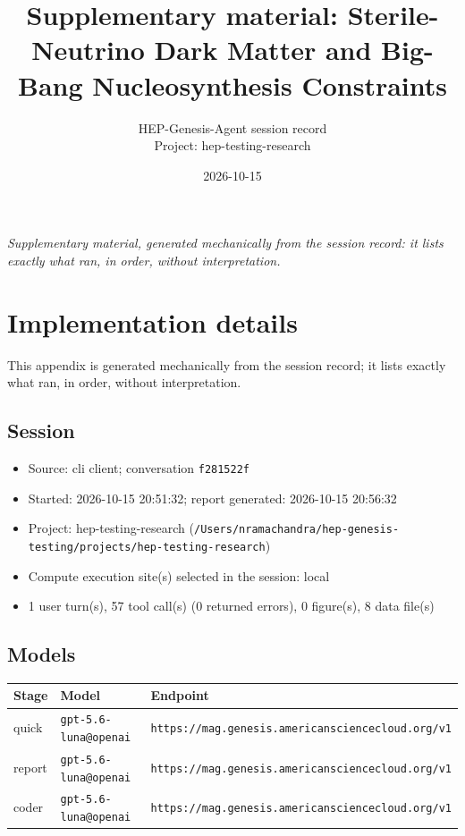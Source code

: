 \documentclass[11pt,a4paper]{article}
\title{Supplementary material: Sterile-Neutrino Dark Matter and Big-Bang Nucleosynthesis Constraints}
\author{HEP-Genesis-Agent session record \\ \small Project: hep-testing-research}
\date{2026-10-15}
\begin{document}
\maketitle
\noindent\textit{\small Supplementary material, generated mechanically from the session record: it lists exactly what ran, in order, without interpretation.}
\vspace{1em}



\appendix
\section{Implementation details}
\label{app:impl}
This appendix is generated mechanically from the session record; it lists exactly what ran, in order, without interpretation.
\subsection{Session}
\begin{itemize}
  \item Source: cli client; conversation \texttt{f281522f}
  \item Started: 2026-10-15 20:51:32; report generated: 2026-10-15 20:56:32
  \item Project: hep-testing-research (\texttt{/\allowbreak{}Users/\allowbreak{}nramachandra/\allowbreak{}hep-genesis-testing/\allowbreak{}projects/\allowbreak{}hep-testing-research})
  \item Compute execution site(s) selected in the session: local
  \item 1 user turn(s), 57 tool call(s) (0 returned errors), 0 figure(s), 8 data file(s)
\end{itemize}
\subsection{Models}
\begin{longtable}{@{}p{}p{}p{}@{}}
\toprule Stage & Model & Endpoint \\ \midrule \endhead
quick & \texttt{gpt-5.6-luna@openai} & \texttt{https:\allowbreak{}/\allowbreak{}/\allowbreak{}mag.genesis.americansciencecloud.org/\allowbreak{}v1} \\
report & \texttt{gpt-5.6-luna@openai} & \texttt{https:\allowbreak{}/\allowbreak{}/\allowbreak{}mag.genesis.americansciencecloud.org/\allowbreak{}v1} \\
coder & \texttt{gpt-5.6-luna@openai} & \texttt{https:\allowbreak{}/\allowbreak{}/\allowbreak{}mag.genesis.americansciencecloud.org/\allowbreak{}v1} \\
\bottomrule\end{longtable}
\end{document}

